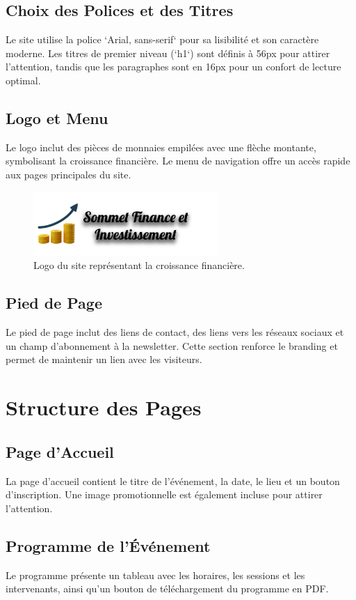 \documentclass[12pt,twoside,letterpaper]{article}
\begin{document}
\begin{Large}
\subsection{Choix des Polices et des Titres}
Le site utilise la police `Arial, sans-serif` pour sa lisibilité et son caractère moderne. Les titres de premier niveau (`h1`) sont définis à 56px pour attirer l’attention, tandis que les paragraphes sont en 16px pour un confort de lecture optimal.

\subsection{Logo et Menu}
Le logo inclut des pièces de monnaies empilées avec une flèche montante, symbolisant la croissance financière. Le menu de navigation offre un accès rapide aux pages principales du site.
\begin{figure}[h!]
    \centering
    \includegraphics[width=7cm]{Logo 1.png} 
    \caption{Logo du site représentant la croissance financière.}
    \label{fig:logo}
\end{figure} 

\subsection{Pied de Page}
Le pied de page inclut des liens de contact, des liens vers les réseaux sociaux et un champ d’abonnement à la newsletter. Cette section renforce le branding et permet de maintenir un lien avec les visiteurs.

\section{Structure des Pages}
\subsection{Page d'Accueil}
La page d’accueil contient le titre de l’événement, la date, le lieu et un bouton d'inscription. Une image promotionnelle est également incluse pour attirer l’attention.

\subsection{Programme de l'Événement}
Le programme présente un tableau avec les horaires, les sessions et les intervenants, ainsi qu'un bouton de téléchargement du programme en PDF.


\end{Large}
\end{document}
